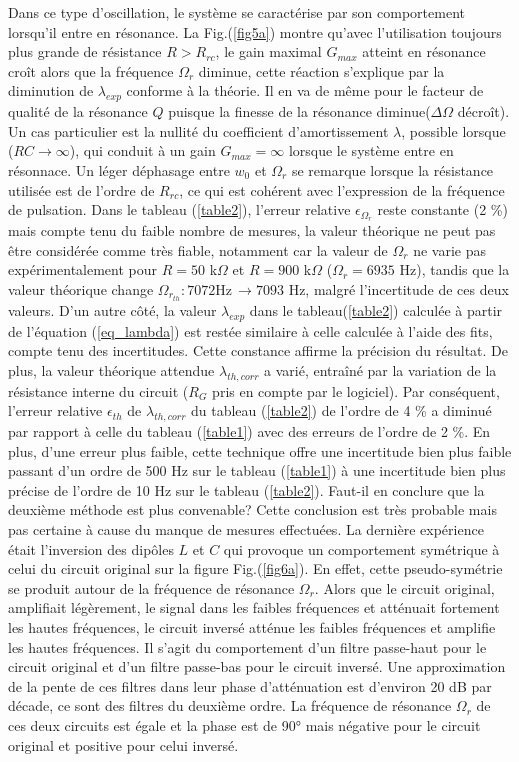 \documentclass[a4paper, 12pt,oneside]{article}
\begin{document}
Dans ce type d'oscillation, le système se caractérise par son comportement lorsqu'il entre en résonance. La Fig.(\ref{fig5a}) montre qu'avec l'utilisation toujours plus grande de résistance $R > R_{rc}$, le gain maximal $G_{max}$ atteint en résonance croît alors que la fréquence $\Omega_r$ diminue, cette réaction s'explique par la diminution de $\lambda_{exp}$ conforme à la théorie. Il en va de même pour le facteur de qualité de la résonance $Q$ puisque la finesse de la résonance diminue($\Delta\Omega$ décroît). Un cas particulier est la nullité du coefficient d'amortissement $\lambda$, possible lorsque ($RC\rightarrow\infty$), qui conduit à un gain $G_{max} = \infty$ lorsque le système entre en résonnace. Un léger déphasage entre $w_0$ et $\Omega_r$ se remarque lorsque la résistance utilisée est de l'ordre de $R_{rc}$, ce qui est cohérent avec l'expression de la fréquence de pulsation. Dans le tableau (\ref{table2}), l'erreur relative $\epsilon_{\Omega_r}$ reste constante (2 \%) mais compte tenu du faible nombre de mesures, la valeur théorique ne peut pas être considérée comme très fiable, notamment car la valeur de $\Omega_r$ ne varie pas expérimentalement pour $R = 50$ k$\Omega$ et $R=900$ k$\Omega$ ($\Omega_r = 6935$ Hz), tandis que la valeur théorique change $\Omega_{r_{th}}: 7072 \text{Hz}\,\rightarrow 7093$ Hz, malgré l'incertitude de ces deux valeurs. D'un autre côté, la valeur $\lambda_{exp}$ dans le tableau(\ref{table2}) calculée à partir de l'équation (\ref{eq_lambda}) est restée similaire à celle calculée à l'aide des fits, compte tenu des incertitudes. Cette constance affirme la précision du résultat. De plus, la valeur théorique attendue $\lambda_{th,corr}$ a varié, entraîné par la variation de la résistance interne du circuit ($R_G$ pris en compte par le logiciel). Par conséquent, l'erreur relative $\epsilon_{th}$ de $\lambda_{th,corr}$ du tableau (\ref{table2}) de l'ordre de 4 \% a diminué par rapport à celle du tableau (\ref{table1}) avec des erreurs de l'ordre de 2 \%. En plus, d'une erreur plus faible, cette technique offre une incertitude bien plus faible passant d'un ordre de 500 Hz sur le tableau (\ref{table1}) à une incertitude bien plus précise de l'ordre de 10 Hz sur le tableau (\ref{table2}). Faut-il en conclure que la deuxième méthode est plus convenable? Cette conclusion est très probable mais pas certaine à cause du manque de mesures effectuées. La dernière expérience était l'inversion des dipôles $L$ et $C$ qui provoque un comportement symétrique à celui du circuit original sur la figure Fig.(\ref{fig6a}). En effet, cette pseudo-symétrie se produit autour de la fréquence de résonance $\Omega_r$. Alors que le circuit original, amplifiait légèrement, le signal dans les faibles fréquences et atténuait fortement les hautes fréquences, le circuit inversé atténue les faibles fréquences et amplifie les hautes fréquences. Il s'agit du comportement d'un filtre passe-haut pour le circuit original et d'un filtre passe-bas pour le circuit inversé. Une approximation de la pente de ces filtres dans leur phase d'atténuation est d'environ 20 dB par décade, ce sont des filtres du deuxième ordre. La fréquence de résonance $\Omega_r$ de ces deux circuits est égale et la phase est de 90° mais négative pour le circuit original et positive pour celui inversé.
\vspace{-0.5cm}
\end{document}
